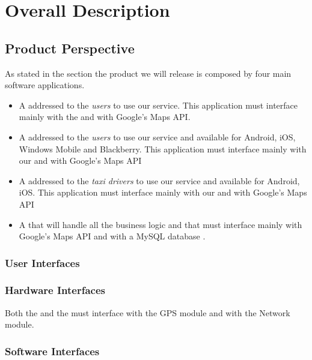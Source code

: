 \section{Overall Description}
\subsection{Product Perspective}
As stated in the \emph{} section the product we will release is composed by four main software applications.
\begin{itemize}
  \item A \textbf{} addressed to the \emph{users}  to use our service. This application must interface mainly with the \textbf{} and with Google's Maps API.
  \item A \textbf{} addressed to the \emph{users} to use our service and available for Android, iOS, Windows Mobile and Blackberry. This application must interface mainly with our \textbf{} and with Google's Maps API
  \item A \textbf{} addressed to the \emph{taxi drivers} to use our service and available for Android, iOS. This application must interface mainly with our \textbf{} and with Google's Maps API

  \item A \textbf{} that will handle all the business logic and that must interface mainly with Google's Maps API and with a MySQL database .
\end{itemize}

\subsubsection{User Interfaces}
\subsubsection{Hardware Interfaces}
Both the \textbf{} and the \textbf{} must interface with the GPS module and with the Network module.\\

\subsubsection{Software Interfaces}
\label{subs:softwareinterfaces}


